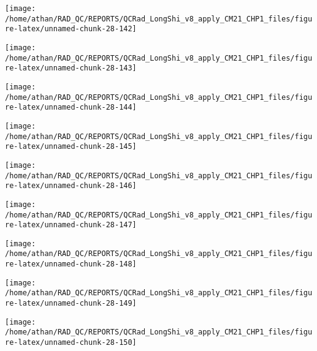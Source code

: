 \documentclass[
  10pt,
  a4paper,oneside]{article}
\begin{document}
\begin{center}\texttt{[image: /home/athan/RAD\_QC/REPORTS/QCRad\_LongShi\_v8\_apply\_CM21\_CHP1\_files/figure-latex/unnamed-chunk-28-142]} \end{center}

\begin{center}\texttt{[image: /home/athan/RAD\_QC/REPORTS/QCRad\_LongShi\_v8\_apply\_CM21\_CHP1\_files/figure-latex/unnamed-chunk-28-143]} \end{center}

\begin{center}\texttt{[image: /home/athan/RAD\_QC/REPORTS/QCRad\_LongShi\_v8\_apply\_CM21\_CHP1\_files/figure-latex/unnamed-chunk-28-144]} \end{center}

\begin{center}\texttt{[image: /home/athan/RAD\_QC/REPORTS/QCRad\_LongShi\_v8\_apply\_CM21\_CHP1\_files/figure-latex/unnamed-chunk-28-145]} \end{center}

\begin{center}\texttt{[image: /home/athan/RAD\_QC/REPORTS/QCRad\_LongShi\_v8\_apply\_CM21\_CHP1\_files/figure-latex/unnamed-chunk-28-146]} \end{center}

\begin{center}\texttt{[image: /home/athan/RAD\_QC/REPORTS/QCRad\_LongShi\_v8\_apply\_CM21\_CHP1\_files/figure-latex/unnamed-chunk-28-147]} \end{center}

\begin{center}\texttt{[image: /home/athan/RAD\_QC/REPORTS/QCRad\_LongShi\_v8\_apply\_CM21\_CHP1\_files/figure-latex/unnamed-chunk-28-148]} \end{center}

\begin{center}\texttt{[image: /home/athan/RAD\_QC/REPORTS/QCRad\_LongShi\_v8\_apply\_CM21\_CHP1\_files/figure-latex/unnamed-chunk-28-149]} \end{center}

\begin{center}\texttt{[image: /home/athan/RAD\_QC/REPORTS/QCRad\_LongShi\_v8\_apply\_CM21\_CHP1\_files/figure-latex/unnamed-chunk-28-150]} \end{center}
\end{document}
